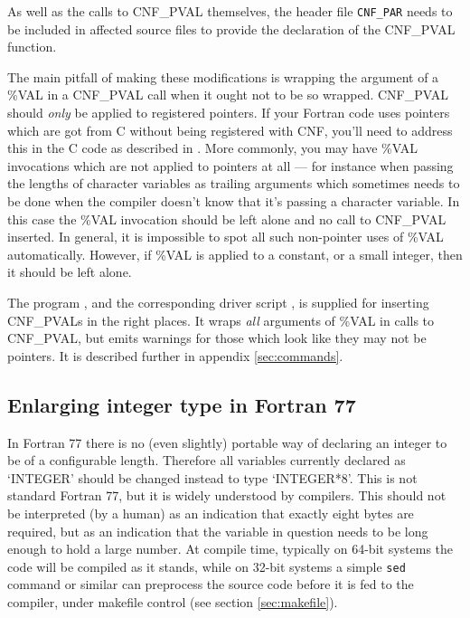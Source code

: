 \documentclass[twoside,11pt,nolof]{starlink}
\providecommand{\xroutine}[1]{\htmlref{\texttt{#1}}{#1}}
\providecommand{\xdofilter}[1]{\htmlref{\texttt{do-#1}}{do-xxx}}
\providecommand{\file}[1]{\texttt{#1}}
\begin{document}
As well as the calls to CNF\_PVAL themselves,
the header file \file{CNF\_PAR} needs to be included
in affected source files to provide the declaration of the CNF\_PVAL function.

The main pitfall of making these modifications is
wrapping the argument of a \%VAL in a CNF\_PVAL call when it ought
not to be so wrapped.
CNF\_PVAL should \emph{only\/} be applied to registered pointers.
If your Fortran code uses pointers which are got from C without
being registered with CNF, you'll need to address this in the C code
as described in .
More commonly, you may have \%VAL invocations which are not
applied to pointers at all --- for instance when passing
the lengths of character variables as trailing arguments
which sometimes needs to be done when the compiler doesn't know that
it's passing a character variable.  In this case the \%VAL
invocation should be left alone and no call to CNF\_PVAL inserted.
In general, it is impossible to spot all such non-pointer uses
of \%VAL automatically.  However, if \%VAL is applied to a constant,
or a small integer, then it should be left alone.

The program \xroutine{inscnf}, and the corresponding driver script
\xdofilter{inscnf}, is supplied for inserting CNF\_PVALs
in the right places.  It wraps \emph{all\/} arguments of \%VAL
in calls to CNF\_PVAL, but emits warnings for those which look like
they may not be pointers.
It is described further in
appendix \ref{sec:commands}.


\subsection{Enlarging integer type in Fortran 77\label{sec:fint}}


In Fortran 77 there is no (even slightly) portable way of declaring
an integer to be of a configurable length.
Therefore all variables currently declared as `INTEGER'
should be changed instead to type `INTEGER*8'.
This is not standard Fortran 77, but it is widely understood by compilers.
This should not be interpreted (by a human) as an indication that exactly
eight bytes are required, but as an indication that
the variable in question needs to be
long enough to hold a large number.
At compile time, typically on 64-bit systems the code will be compiled
as it stands, while on 32-bit systems a simple \file{sed} command or similar
can preprocess the source code before it is fed to the compiler,
under makefile control (see section \ref{sec:makefile}).
\end{document}
